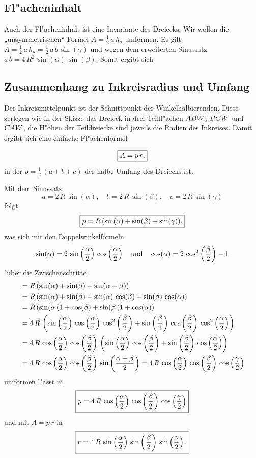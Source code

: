 \documentclass[11pt,a4paper]{article}
\begin{document}
\subsection{Fl"acheninhalt}
\label{sec.3.2}
Auch der Fl"acheninhalt ist eine Invariante des Dreiecks. Wir wollen die
„unsymmetrischen“ Formel $A=\frac12\,a\,h_a$ umformen. Es gilt
$A=\frac12\,a\,h_a=\frac12\,a\,b\,\sin(\gamma)$ und wegen dem erweiterten
Sinussatz $a\,b=4\,R^2\,\sin(\alpha)\,\sin(\beta)$.  Somit ergibt sich
\begin{center}
\end{center}

\subsection{Zusammenhang zu Inkreisradius und Umfang}
\label{sec.3.3}
\parbox{6cm}{Der Inkreismittelpunkt ist der Schnittpunkt der
  Winkelhalbierenden.  Diese zerlegen wie in der Skizze das Dreieck in drei
  Teilfl"achen $\ktriangle*{ABW}$, $\ktriangle*{BCW}$ und $\ktriangle*{CAW}$,
  die H"ohen der Teildreiecke sind jeweils die Radien des Inkreises. Damit
  ergibt sich eine einfache Fl"achenformel } 
\hfill
\parbox{6cm}{ }

\[\framebox{$A=p\,r$,}\]
in der $p=\frac12\,(a+b+c)$ der halbe Umfang des Dreiecks ist. 

Mit dem Sinussatz 
\[ a=2\,R\,\sin(\alpha), \quad b=2\,R\,\sin(\beta), \quad
c=2\,R\,\sin(\gamma) \] 
folgt
\[\framebox{$\displaystyle p=R\,(\sin(\alpha)+\sin(\beta)+\sin(\gamma)),$}\]
was sich mit den Doppelwinkelformeln 
\[ \sin(\alpha)=2\,\sin\left(\frac\alpha2\right)\,\cos\left(\frac\alpha2\right)\quad
\text{und} \quad\cos(\alpha)=2\,\cos^2\left(\frac\beta2\right)-1\] 
"uber die Zwischenschritte
\begin{align*}
 &=R\,(\sin(\alpha) +\sin(\beta)+\sin(\alpha+\beta))\\ 
 &=R\,(\sin(\alpha)+\sin(\beta) +\sin(\alpha)\,\cos(\beta)
  +\sin(\beta)\,\cos(\alpha))\\ 
 &=R\,(\sin(\alpha\,(1+\cos(\beta)+\sin(\beta\,(1+\cos(\alpha))\\
 &=4\,R\,\left(\sin\left(\frac\alpha2\right)\,\cos\left(\frac\alpha2\right)\,
    \cos^2\left(\frac\beta2\right) +\sin\left(\frac\beta2\right)\, \cos\left(\frac\beta2\right)\,
    \cos^2\left(\frac\alpha2\right)\right)\\  
 &=4\,R\,\cos\left(\frac\alpha2\right)\,\cos\left(\frac\beta2\right)\,
  \left(\sin\left(\frac\alpha2\right)\,\cos\left(\frac\beta2\right)
    +\sin\left(\frac\beta2\right)\,\cos\left(\frac\alpha2\right)\right)\\ 
 &=4\,R\,\cos\left(\frac\alpha2\right)\,\cos\left(\frac\beta2\right)\,
  \sin\left(\frac{\alpha+\beta}2\right)
  =4\,R\,\cos\left(\frac\alpha2\right)\,\cos\left(\frac\beta2\right)\,\cos\left(\frac\gamma2\right) 
\end{align*}
umformen l"asst in
\[\framebox{$\displaystyle  p=4\,R\,\cos\br{\frac\alpha2}\,
  \cos\br{\frac\beta2}\, \cos\br{\frac\gamma2}$} 
\] 
und mit $A=p\,r$ in
\[\framebox{$\displaystyle   r=4\,R\,\sin\br{\frac\alpha2}\,
  \sin\br{\frac\beta2}\,\sin\br{\frac\gamma2}.$} \] 
\end{document}
